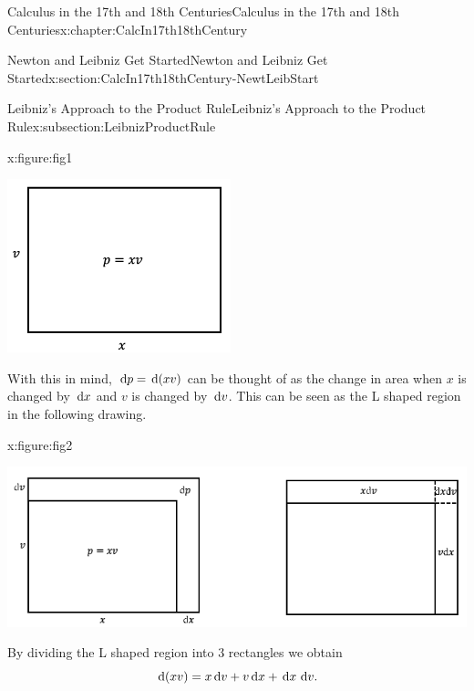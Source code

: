 \begin{chapterptx}{Calculus in the 17th and 18th Centuries}{}{Calculus in the 17th and 18th Centuries}{}{}{x:chapter:CalcIn17th18thCentury}
\begin{sectionptx}{Newton and Leibniz Get Started}{}{Newton and Leibniz Get Started}{}{}{x:section:CalcIn17th18thCentury-NewtLeibStart}
\begin{subsectionptx}{Leibniz's Approach to the Product Rule}{}{Leibniz's Approach to the Product Rule}{}{}{x:subsection:LeibnizProductRule}
\begin{figureptx}{}{x:figure:fig1}{}
				\begin{image}{0.25}{0.5}{0.25}%
					\includegraphics[width=\linewidth]{external/images/fig1.png}
				\end{image}%
				\tcblower
			\end{figureptx}%
			With this in mind, \(\,{\rm d} p=\,{\rm d}(xv)\) can be thought of as the change in area when \(x\) is changed by \(\,{\rm d} x\) and \(v\) is changed by \(\,{\rm d} v\).  This can be seen as the L shaped region in the following drawing.%
			\begin{figureptx}{}{x:figure:fig2}{}%
				\begin{image}{0.05}{0.9}{0.05}%
					\includegraphics[width=\linewidth]{external/images/fig2.png}
				\end{image}%
				\tcblower
			\end{figureptx}%
			By dividing the L shaped region into 3 rectangles we obtain%
			\begin{equation}
				\,{\rm d}(xv)=x\,{\rm d} v+v\,{\rm d} x+\,{\rm d} x\,\,{\rm d} v\text{.}\label{x:men:eq_LeibnizProductRule}
			\end{equation}
			\par

\end{subsectionptx}
\end{sectionptx}
\end{chapterptx}
